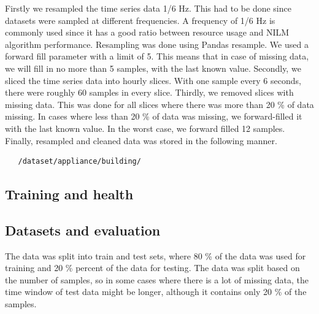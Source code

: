 Firstly we resampled the time series data  1/6 Hz. 
This had to be done since datasets were sampled at different frequencies.
A frequency of 1/6 Hz is commonly used since it has a good ratio between resource usage and NILM algorithm performance.
Resampling was done using Pandas resample. 
We used a forward fill parameter with a limit of 5.
This means that in case of missing data, we will fill in no more than 5 samples, with the last known value.
Secondly, we sliced the time series data into hourly slices. 
With one sample every 6 seconds, there were roughly 60 samples in every slice.
Thirdly, we removed slices with missing data.
This was done for all slices where there was more than 20 \% of data missing.
In cases where less than 20 \% of data was missing, we forward-filled it with the last known value.
In the worst case, we forward filled 12 samples. 
Finally, resampled and cleaned data was stored in the following manner.
\begin{verbatim}
   /dataset/appliance/building/
\end{verbatim}

\subsection{Training and health}

\subsection{Datasets and evaluation} \label{ssec:ds_eval}

The data was split into train and test sets, where 80 \% of the data was used for training and 20 \% percent of the data for testing.
The data was split based on the number of samples, so in some cases where there is a lot of missing data, the time window of test data might be longer, although it contains only 20 \% of the samples.

